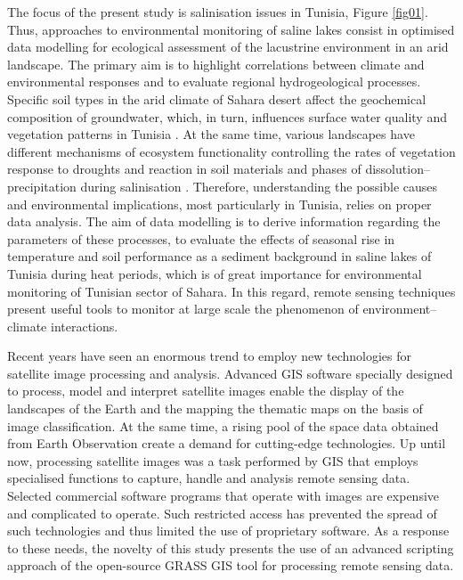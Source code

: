 \documentclass[land,article,accept,pdftex,moreauthors]{Definitions/mdpi}
\begin{document}
{The focus of the present study is salinisation issues in Tunisia, Figure} \ref{fig01}. {Thus,} approaches to environmental monitoring {of saline lakes consist in} optimised data modelling {for} ecological {assessment of the lacustrine environment in an arid landscape. The primary aim is} to highlight correlations between climate and environmental responses \cite{BESSER2021104134} and to evaluate regional hydrogeological processes{. Specific soil types in the arid climate of} Sahara desert {affect} the geochemical composition of groundwater, which, {in turn, }influences surface water quality and vegetation patterns in Tunisia \cite{HAMDI2021102974,RAFAATRIGUI2021104121}. At the same time, various landscapes have different mechanisms of ecosystem functionality controlling the rates of vegetation response to droughts and reaction in soil materials and phases of dissolution–precipitation during salinisation \cite{NAVARROTORRE2023105397}. Therefore, {understanding the possible causes and environmental implications, most particularly in Tunisia, relies on proper data analysis. The aim of data modelling is to derive information regarding }the parameters of these processes, {to evaluate }the effects of seasonal rise in temperature and soil performance as a sediment background in saline lakes of Tunisia during heat periods, {which }is of great importance for environmental monitoring of Tunisian sector of Sahara. {In this regard, remote sensing techniques present useful tools to monitor at large scale the phenomenon of environment--climate interactions.}

{Recent years have seen an enormous trend to employ new technologies for satellite image processing and analysis. Advanced GIS software specially designed to process, model and interpret satellite images enable the display of the landscapes of the Earth and the mapping the thematic maps on the basis of image classification. At the same time, a rising pool of the space data obtained from Earth Observation create a demand for cutting-edge technologies. Up until now, processing satellite images was a task performed by GIS that employs specialised functions to capture, handle and analysis remote sensing data. Selected commercial software programs that operate with images are expensive and complicated to operate. Such restricted access has prevented the spread of such technologies and thus limited  the use of proprietary software. As a response to these needs, the novelty of this study presents the use of an advanced scripting approach of the open-source GRASS GIS tool for processing remote sensing data.}
\end{document}
